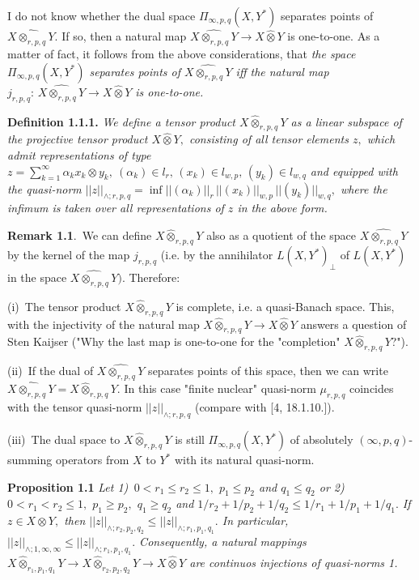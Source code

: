  I do not know whether the dual space $\Pi_{\infty,p,q}(X, Y^*)$ sepa\-ra\-tes
 points of $\widehat{X\otimes_{r,p,q} Y}.$ If so, then a natural map
   $\widehat{X\otimes_{r,p,q} Y}\to X\widehat\otimes Y$ is one-to-one. As a matter of fact,
   it follows from the above considerations, that
 {\it the space $\Pi_{\infty,p,q}(X, Y^*)$ separates
 points of $\widehat{X\otimes_{r,p,q} Y}$ iff the natural map
   $j_{r,p,q}:\, \widehat{X\otimes_{r,p,q} Y}\to X\widehat\otimes Y$ is one-to-one.}
       \smallskip

 \textbf{Definition 1.1.1.}  {\it
 We define a tensor product $X\widehat\otimes_{r,p,q} Y$ as a linear subspace of
 the projective tensor product $X\widehat\otimes Y,$ consisting of all tensor elements $z,$
 which admit representations of type
 $
  z=\sum_{k=1}^\infty \alpha_k x_k\otimes y_k,\
  (\alpha_k)\in l_r,\, (x_k)\in l_{w,p},\, (y_k)\in l_{w,q}
 $
 and equipped with the quasi-norm $||z||_{\land\!; r,p,q}= \inf ||(\alpha_k)||_r\,
  ||(x_k)||_{w,p}\, ||(y_k)||_{w,q},$ where the infimum is taken over all
  representations of $z$ in the above form.
  }
       \smallskip

 \textbf{Remark 1.1}.\,
  We can define $X\widehat\otimes_{r,p,q} Y$ also as a quotient of the space $\widehat{X\otimes_{r,p,q} Y}$
 by the kernel of the map $j_{r,p,q}$ (i.e. by the annihilator $L(X,Y^*)_{\perp}$ of
$L(X,Y^*)$ in the space $\widehat{X\otimes_{r,p,q} Y}).$ Therefore:

 (i)\,
 The tensor product $X\widehat\otimes_{r,p,q} Y$ is complete, i.e. a quasi-Banach space.
This, with the injectivity of the natural map $X\widehat\otimes_{r,p,q} Y\to X\widehat\otimes Y$
answers a  question of Sten Kaijser ("Why the last map is one-to-one
for the "completion" $X\widehat\otimes_{r,p,q} Y$?").

 (ii)\,
If the dual of $\widehat{X\otimes_{r,p,q} Y}$ separates points of this space,
 then we can write $\widehat{X\otimes_{r,p,q} Y}= X\widehat\otimes_{r,p,q} Y.$ In this case
 "finite nuclear" quasi-norm $\mu_{r,p,q}$ coincides with the tensor quasi-norm
$||z||_{\land\!; r,p,q}$ (compare with [4, 18.1.10.]).

(iii)\,
 The dual space to $X\widehat\otimes_{r,p,q} Y$ is still
 $\Pi_{\infty,p,q}(X,Y^*)$ of absolutely $(\infty,p,q)$-summing operators
from $X$ to $Y^*$ with its natural quasi-norm.
                        \smallskip


\textbf{Proposition 1.1} {\it
Let
1)\,
$0<r_1\leqslant r_2\leqslant1,$ $p_1\leqslant p_2$ and $q_1\leqslant q_2$
or
2)\,
 $0<r_1< r_2\leqslant1,$ $p_1\geqslant p_2,$ $q_1\geqslant q_2$ and
 $1/r_2+1/p_2+1/q_2\leqslant 1/r_1+1/p_1+1/q_1.$
If $z\in X\otimes Y,$ then
 $||z||_{\land\!; r_2,p_2,q_2} \leqslant ||z||_{\land\!; r_1,p_1,q_1}.$
In particular,
$||z||_{\land\!; 1,\infty,\infty} \leqslant ||z||_{\land\!; r_1,p_1,q_1}.$
Consequen\-t\-ly, a natural mappings
$X\widehat\otimes_{r_1,p_1,q_1} Y\to X\widehat\otimes_{r_2,p_2,q_2} Y\to X\widehat\otimes Y$ are continuos
injections of quasi-norms 1.
}
                       \smallskip


